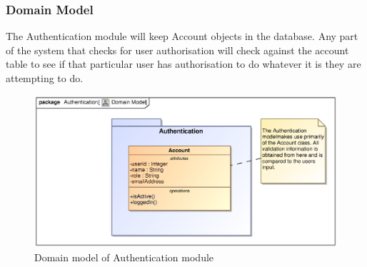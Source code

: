\newpage
\subsubsection{Domain Model}
\par{ The Authentication module will keep Account objects in the database. Any part of the system that checks for user authorisation will check against the account table to see if that particular user has authorisation to do whatever it is they are attempting to do. }

\begin{figure}[h]
\includegraphics[scale=0.9]{epsImages/Authentication/domainModel.eps}
\caption{Domain model of Authentication module}
\end{figure}
